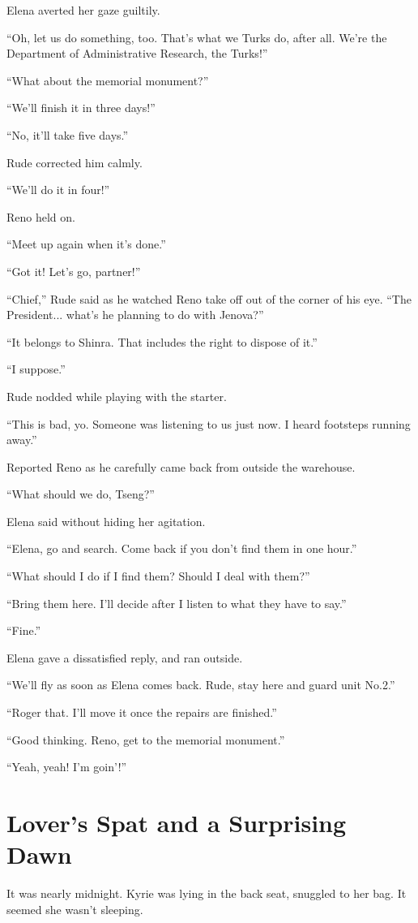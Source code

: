 \documentclass[oneside]{book}
\begin{document}
Elena averted her gaze guiltily.

“Oh, let us do something, too. That’s what we Turks do, after all. We’re the Department of Administrative Research, the Turks!”

“What about the memorial monument?”

“We’ll finish it in three days!”

“No, it’ll take five days.”

Rude corrected him calmly.

“We’ll do it in four!”

Reno held on.

“Meet up again when it’s done.”

“Got it! Let’s go, partner!”

“Chief,” Rude said as he watched Reno take off out of the corner of his eye. “The President... what’s he planning to do with Jenova?”

“It belongs to Shinra. That includes the right to dispose of it.”

“I suppose.”

Rude nodded while playing with the starter.

“This is bad, yo. Someone was listening to us just now. I heard footsteps running away.”

Reported Reno as he carefully came back from outside the warehouse.

“What should we do, Tseng?”

Elena said without hiding her agitation.

“Elena, go and search. Come back if you don’t find them in one hour.”

“What should I do if I find them? Should I deal with them?”

“Bring them here. I’ll decide after I listen to what they have to say.”

“Fine.”

Elena gave a dissatisfied reply, and ran outside.

“We’ll fly as soon as Elena comes back. Rude, stay here and guard unit No.2.”

“Roger that. I’ll move it once the repairs are finished.”

“Good thinking. Reno, get to the memorial monument.”

“Yeah, yeah! I’m goin’!”

\chapter{Lover’s Spat and a Surprising Dawn}
It was nearly midnight. Kyrie was lying in the back seat, snuggled to her bag. It seemed she wasn’t sleeping.
\end{document}

